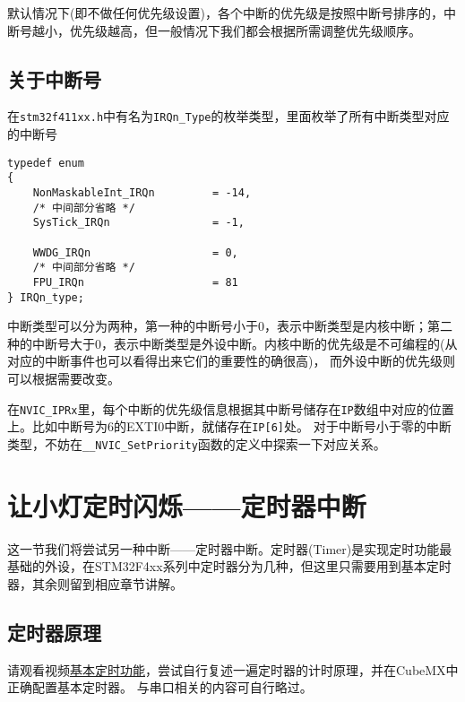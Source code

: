 默认情况下(即不做任何优先级设置)，各个中断的优先级是按照中断号排序的，中断号越小，优先级越高，但一般情况下我们都会根据所需调整优先级顺序。
\subsection{关于中断号}
在\verb|stm32f411xx.h|中有名为\verb|IRQn_Type|的枚举类型，里面枚举了所有中断类型对应的中断号
\begin{lstlisting}
typedef enum
{
    NonMaskableInt_IRQn         = -14,
    /* 中间部分省略 */
    SysTick_IRQn                = -1,

    WWDG_IRQn                   = 0,
    /* 中间部分省略 */
    FPU_IRQn                    = 81
} IRQn_type;
\end{lstlisting}
中断类型可以分为两种，第一种的中断号小于0，表示中断类型是内核中断；第二种的中断号大于0，表示中断类型是外设中断。内核中断的优先级是不可编程的(从对应的中断事件也可以看得出来它们的重要性的确很高)，
而外设中断的优先级则可以根据需要改变。

在\verb|NVIC_IPRx|里，每个中断的优先级信息根据其中断号储存在\verb|IP|数组中对应的位置上。比如中断号为6的EXTI0中断，就储存在\verb|IP[6]|处。
对于中断号小于零的中断类型，不妨在\verb|__NVIC_SetPriority|函数的定义中探索一下对应关系。

\section{让小灯定时闪烁——定时器中断}
这一节我们将尝试另一种中断——定时器中断。定时器(Timer)是实现定时功能最基础的外设，在STM32F4xx系列中定时器分为几种，但这里只需要用到基本定时器，其余则留到相应章节讲解。
\subsection{定时器原理}
请观看视频\href{https://www.bilibili.com/video/BV11u4y1A7gS/?share_source=copy_web&vd_source=00b9d329964a93c9843f9c524074f948}{基本定时功能}，尝试自行复述一遍定时器的计时原理，并在CubeMX中正确配置基本定时器。
与串口相关的内容可自行略过。
